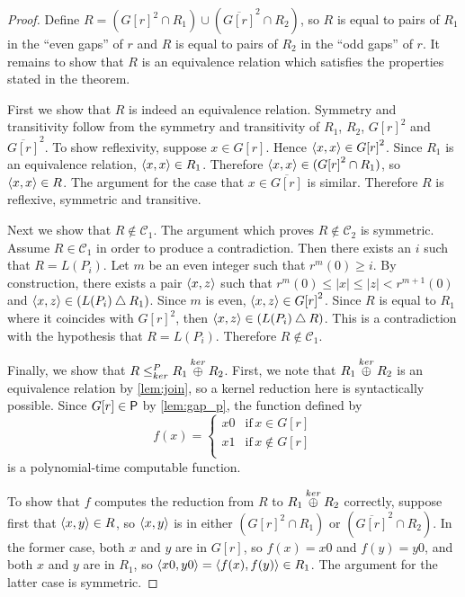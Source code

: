 \begin{proof}
  Define $R=({G[r]}^2\cap R_1)\cup(\overline{G[r]}^2\cap R_2)$, so $R$ is equal to pairs of $R_1$ in the ``even gaps'' of $r$ and $R$ is equal to pairs of $R_2$ in the ``odd gaps'' of $r$.
  It remains to show that $R$ is an equivalence relation which satisfies the properties stated in the theorem.

  First we show that $R$ is indeed an equivalence relation.
  Symmetry and transitivity follow from the symmetry and transitivity of $R_1$, $R_2$, ${G[r]}^2$ and $\overline{G[r]}^2$.
  To show reflexivity, suppose $x\in G[r]$.
  Hence $\pair{x}{x}\in {G[r]}^2$.
  Since $R_1$ is an equivalence relation, $\pair{x}{x}\in R_1$.
  Therefore $\pair{x}{x}\in({G[r]}^2\cap R_1)$, so $\pair{x}{x}\in R$.
  The argument for the case that $x\in\overline{G[r]}$ is similar.
  Therefore $R$ is reflexive, symmetric and transitive.

  Next we show that $R\notin\mathcal{C}_1$.
  The argument which proves $R\notin\mathcal{C}_2$ is symmetric.
  Assume $R\in\mathcal{C}_1$ in order to produce a contradiction.
  Then there exists an $i$ such that $R=L(P_i)$.
  Let $m$ be an even integer such that $r^m(0)\geq i$.
  By construction, there exists a pair $\pair{x}{z}$ such that $r^m(0)\leq|x|\leq|z|<r^{m+1}(0)$ and $\pair{x}{z}\in(L(P_i)\symdiff R_1)$.
  Since $m$ is even, $\pair{x}{z}\in {G[r]}^2$.
  Since $R$ is equal to $R_1$ where it coincides with ${G[r]}^2$, then $\pair{x}{z}\in(L(P_i)\symdiff R)$.
  This is a contradiction with the hypothesis that $R=L(P_i)$.
  Therefore $R\notin\mathcal{C}_1$.

  Finally, we show that $R\kr R_1\kj R_2$.
  First, we note that $R_1\kj R_2$ is an equivalence relation by \autoref{lem:join}, so a kernel reduction here is syntactically possible.
  Since $G[r]\in\P$ by \autoref{lem:gap_p}, the function defined by
  \begin{displaymath}
    f(x)=
    \begin{cases}
      x0 & \text{if}\, x\in G[r]\\
      x1 & \text{if}\, x\notin G[r]\\
    \end{cases}
  \end{displaymath}
  is a polynomial-time computable function.
  
  To show that $f$ computes the reduction from $R$ to $R_1\kj R_2$ correctly, suppose first that $\pair{x}{y}\in R$, so $\pair{x}{y}$ is in either $({G[r]}^2\cap R_1)$ or $(\overline{G[r]}^2\cap R_2)$.
  In the former case, both $x$ and $y$ are in $G[r]$, so $f(x)=x0$ and $f(y)=y0$, and both $x$ and $y$ are in $R_1$, so $\pair{x0}{y0}=\pair{f(x)}{f(y)}\in R_1$.
  The argument for the latter case is symmetric.


\end{proof}
